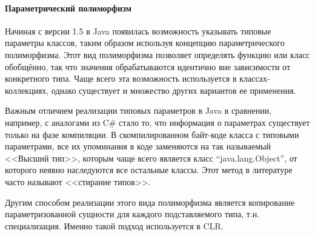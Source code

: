 \paragraph{Параметрический полиморфизм}
Начиная с версии 1.5 в Java появилась возможность указывать типовые параметры классов, таким
образом используя концепцию параметрического полиморфизма.
Этот вид полиморфизма позволяет определять функцию или класс обобщённо, так что значения
обрабатываются идентично вне зависимости от конкретного типа.
Чаще всего эта возможность используется в классах-коллекциях, однако существует и множество
других вариантов ее применения.

Важным отличием реализации типовых параметров в Java в сравнении, например, с аналогами из C\#
стало то, что информация о параметрах существует только на фазе компиляции.
В скомпилированном байт-коде класса с типовыми параметрами, все их упоминания в коде заменяются на
так называемый <<Высший тип>>, которым чаще всего является класс ``java.lang.Object'', от которого
неявно наследуются все остальные классы. Этот метод в литературе часто называют <<стирание типов>>.

Другим способом реализации этого вида полиморфизма является копирование параметризованной сущности
для каждого подставляемого типа, т.н. специализация. Именно такой подход используется в
CLR\cite{CLRGenerics}.

